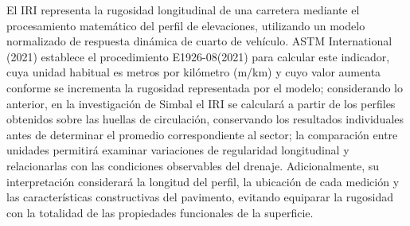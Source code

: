 El IRI representa la rugosidad longitudinal de una carretera mediante el procesamiento matemático del perfil de elevaciones, utilizando un modelo normalizado de respuesta dinámica de cuarto de vehículo. ASTM International (2021) establece el procedimiento E1926-08(2021) para calcular este indicador, cuya unidad habitual es metros por kilómetro (m/km) y cuyo valor aumenta conforme se incrementa la rugosidad representada por el modelo; considerando lo anterior, en la investigación de Simbal el IRI se calculará a partir de los perfiles obtenidos sobre las huellas de circulación, conservando los resultados individuales antes de determinar el promedio correspondiente al sector; la comparación entre unidades permitirá examinar variaciones de regularidad longitudinal y relacionarlas con las condiciones observables del drenaje. Adicionalmente, su interpretación considerará la longitud del perfil, la ubicación de cada medición y las características constructivas del pavimento, evitando equiparar la rugosidad con la totalidad de las propiedades funcionales de la superficie.
\endgroup
